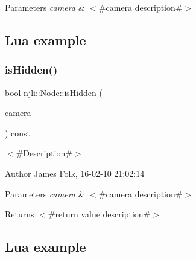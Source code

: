 \begin{DoxyParams}{Parameters}
{\em camera} & $<$\#camera description\#$>$\\
\hline
\end{DoxyParams}
\hypertarget{classnjli_1_1_steering_behavior_wander_ex1}{}\subsection{Lua example}\label{classnjli_1_1_steering_behavior_wander_ex1}

\begin{DoxyCodeInclude}
\end{DoxyCodeInclude}
\mbox{\label{classnjli_1_1_node_a8e2d933072775e46519812b890f44b26}} 
\subsubsection{\texorpdfstring{is\+Hidden()}{isHidden()}}
{\footnotesize\ttfamily bool njli\+::\+Node\+::is\+Hidden (\begin{DoxyParamCaption}\item[{\mbox{\hyperlink{classnjli_1_1_camera}{Camera}} $\ast$}]{camera }\end{DoxyParamCaption}) const}



$<$\#\+Description\#$>$ 

\begin{DoxyAuthor}{Author}
James Folk, 16-\/02-\/10 21\+:02\+:14
\end{DoxyAuthor}

\begin{DoxyParams}{Parameters}
{\em camera} & $<$\#camera description\#$>$\\
\hline
\end{DoxyParams}
\begin{DoxyReturn}{Returns}
$<$\#return value description\#$>$
\end{DoxyReturn}
\hypertarget{classnjli_1_1_steering_behavior_wander_ex1}{}\subsection{Lua example}\label{classnjli_1_1_steering_behavior_wander_ex1}

\begin{DoxyCodeInclude}
\end{DoxyCodeInclude}
\mbox{\label{classnjli_1_1_node_a67b6e23d47cf7be1b80f2c137a66081c}} 
